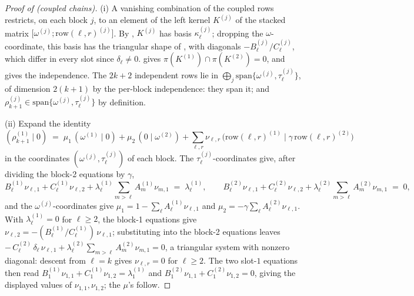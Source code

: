 \documentclass{article}
\theoremstyle{definition}
\begin{document}
\begin{proof}[Proof of  (coupled chains)]
(i) A vanishing combination of the coupled rows restricts, on each block $j$, to an element of the left kernel $K^{(j)}$ of the stacked matrix $\big[\omega^{(j)}; \mathrm{row}(\ell,r)^{(j)}\big]$. By , $K^{(j)}$ has basis $\kappa^{(j)}_\ell$; dropping the $\omega$-coordinate, this basis has the triangular shape of , with diagonals $-B^{(j)}_\ell / C^{(j)}_\ell$, which differ in every slot since $\delta_\ell \neq 0$.  gives $\pi(K^{(1)}) \cap \pi(K^{(2)}) = 0$, and  gives the independence. The $2k + 2$ independent rows lie in $\bigoplus_j \mathrm{span}\{\omega^{(j)}, \tau^{(j)}_\ell\}$, of dimension $2(k+1)$ by the per-block independence: they span it; and $\rho^{(j)}_{k+1} \in \mathrm{span}\{\omega^{(j)}, \tau^{(j)}_\ell\}$ by definition.

(ii) Expand the identity
\[
(\rho^{(1)}_{k+1} \mid 0) \;=\; \mu_1\, (\omega^{(1)} \mid 0) + \mu_2\, (0 \mid \omega^{(2)}) + \sum_{\ell, r} \nu_{\ell, r}\, \big(\mathrm{row}(\ell,r)^{(1)} \mid \gamma\, \mathrm{row}(\ell,r)^{(2)}\big)
\]
in the coordinates $(\omega^{(j)}, \tau^{(j)}_\ell)$ of each block. The $\tau^{(j)}_\ell$-coordinates give, after dividing the block-2 equations by $\gamma$,
\[
B^{(1)}_\ell \nu_{\ell,1} + C^{(1)}_\ell \nu_{\ell,2} + \lambda^{(1)}_\ell \!\sum_{m > \ell}\! A^{(1)}_m \nu_{m,1} \;=\; \lambda^{(1)}_\ell , \qquad
B^{(2)}_\ell \nu_{\ell,1} + C^{(2)}_\ell \nu_{\ell,2} + \lambda^{(2)}_\ell \!\sum_{m > \ell}\! A^{(2)}_m \nu_{m,1} \;=\; 0 ,
\]
and the $\omega^{(j)}$-coordinates give $\mu_1 = 1 - \sum_\ell A^{(1)}_\ell \nu_{\ell,1}$ and $\mu_2 = -\gamma \sum_\ell A^{(2)}_\ell \nu_{\ell,1}$. With $\lambda^{(1)}_\ell = 0$ for $\ell \geq 2$, the block-1 equations give $\nu_{\ell,2} = -(B^{(1)}_\ell / C^{(1)}_\ell)\, \nu_{\ell,1}$; substituting into the block-2 equations leaves $-\,C^{(2)}_\ell\, \delta_\ell\, \nu_{\ell,1} + \lambda^{(2)}_\ell \sum_{m>\ell} A^{(2)}_m \nu_{m,1} = 0$, a triangular system with nonzero diagonal: descent from $\ell = k$ gives $\nu_{\ell, r} = 0$ for $\ell \geq 2$. The two slot-$1$ equations then read $B^{(1)}_1 \nu_{1,1} + C^{(1)}_1 \nu_{1,2} = \lambda^{(1)}_1$ and $B^{(2)}_1 \nu_{1,1} + C^{(2)}_1 \nu_{1,2} = 0$, giving the displayed values of $\nu_{1,1}, \nu_{1,2}$; the $\mu$'s follow.
\end{proof}
\end{document}
